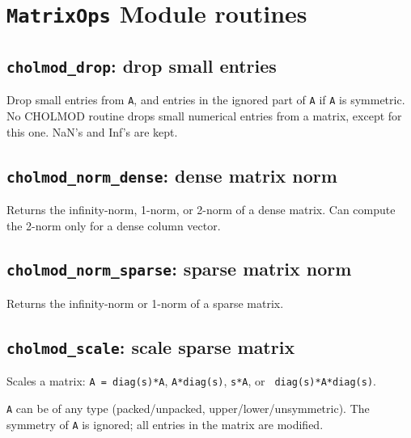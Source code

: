 \documentclass[11pt]{article}
\begin{document}
\newpage \section{{\tt MatrixOps} Module routines}

\subsection{{\tt cholmod\_drop}: drop small entries}


Drop small entries from {\tt A}, and entries in the ignored part of {\tt A} if
{\tt A} is symmetric.  No CHOLMOD routine drops small numerical entries from a
matrix, except for this one.  NaN's and Inf's are kept.

\subsection{{\tt cholmod\_norm\_dense}: dense matrix norm}


Returns the infinity-norm, 1-norm, or 2-norm of a dense matrix.
Can compute the 2-norm only for a dense column vector.

\subsection{{\tt cholmod\_norm\_sparse}: sparse matrix norm}


Returns the infinity-norm or 1-norm of a sparse matrix.

\subsection{{\tt cholmod\_scale}: scale sparse matrix}


Scales a matrix:  {\tt A = diag(s)*A}, {\tt A*diag(s)}, {\tt s*A}, or {\tt
diag(s)*A*diag(s)}.

{\tt A} can be of any type (packed/unpacked, upper/lower/unsymmetric).
The symmetry of {\tt A} is ignored; all entries in the matrix are modified.
\end{document}
